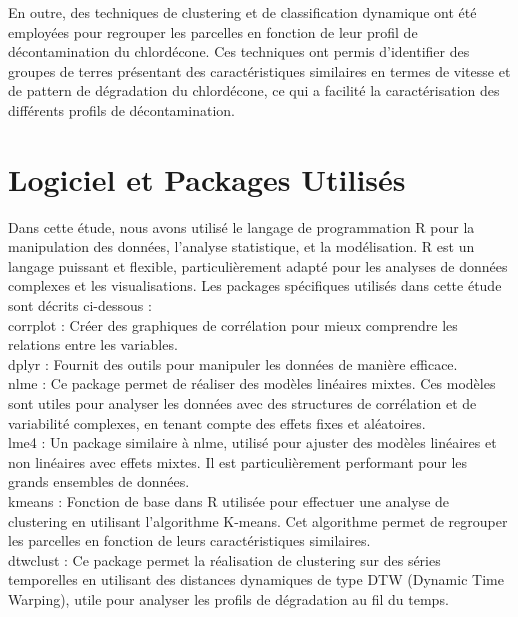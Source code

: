 \documentclass{report}
\begin{document}
En outre, des techniques de clustering et de classification dynamique ont été employées pour regrouper les parcelles en fonction de leur profil de décontamination du chlordécone. Ces techniques ont permis d'identifier des groupes de terres présentant des caractéristiques similaires en termes de vitesse et de pattern de dégradation du chlordécone, ce qui a facilité la caractérisation des différents profils de décontamination.
\\

 \section{Logiciel et Packages Utilisés}
 Dans cette étude, nous avons utilisé le langage de programmation R pour la manipulation des données, l'analyse statistique, et la modélisation. R est un langage puissant et flexible, particulièrement adapté pour les analyses de données complexes et les visualisations. Les packages spécifiques utilisés dans cette étude sont décrits ci-dessous :\\
 
corrplot : Créer des graphiques de corrélation pour mieux comprendre les relations entre les variables.\\
  
dplyr : Fournit des outils pour manipuler les données de manière efficace.\\

nlme : Ce package permet de réaliser des modèles linéaires mixtes. Ces modèles sont utiles pour analyser les données avec des structures de corrélation et de variabilité complexes, en tenant compte des effets fixes et aléatoires.\\

lme4 : Un package similaire à nlme, utilisé pour ajuster des modèles linéaires et non linéaires avec effets mixtes. Il est particulièrement performant pour les grands ensembles de données.\\

kmeans : Fonction de base dans R utilisée pour effectuer une analyse de clustering en utilisant l'algorithme K-means. Cet algorithme permet de regrouper les parcelles en fonction de leurs caractéristiques similaires.\\

dtwclust : Ce package permet la réalisation de clustering sur des séries temporelles en utilisant des distances dynamiques de type DTW (Dynamic Time Warping), utile pour analyser les profils de dégradation au fil du temps.\\
\end{document}
